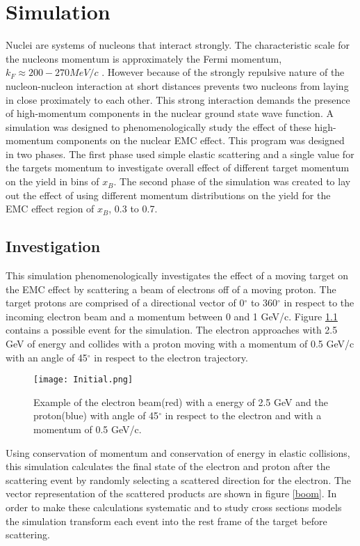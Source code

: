 
\chapter{Simulation}Nuclei are systems of nucleons that interact strongly. The characteristic scale for the nucleons momentum is approximately the Fermi momentum, $k_F \approx 200-270 MeV/c$ \cite{gomez}. However because of the strongly repulsive nature of the nucleon-nucleon interaction at short distances prevents two nucleons from laying in close proximately to each other. This strong interaction demands the presence of high-momentum components in the nuclear ground state wave function. A simulation was designed to phenomenologically study the effect of these high-momentum components on the nuclear EMC effect. This program was designed in two phases. The first phase used simple elastic scattering and a single value for the targets momentum to investigate overall effect of different target momentum on the yield in bins of $x_B$. The second phase of the simulation was created to lay out the effect of using different momentum distributions on the yield for the EMC effect region of $x_B$, 0.3 to 0.7.
\section{Investigation} This simulation phenomenologically investigates the effect of a moving target on the EMC effect by scattering a beam of electrons off of a moving proton. The target protons are comprised of a directional vector of 0$^\circ$ to 360$^\circ$ in respect to the incoming electron beam and a momentum between 0 and 1 GeV/c. Figure \ref{example} contains a possible event for the simulation. The electron approaches with 2.5 GeV of energy and collides with a proton moving with a momentum of 0.5 GeV/c with an angle of 45$^\circ$ in respect to the electron trajectory. 
\begin{figure}[h]
\centering
\caption{Example of the electron beam(red) with a energy of 2.5 GeV and the proton(blue) with angle of 45$^\circ$ in respect to the electron and with a momentum of 0.5 GeV/c.}
\texttt{[image: Initial.png]}
\label{example}
\end{figure}

Using conservation of momentum and conservation of energy in elastic collisions, this simulation calculates the final state of the electron and proton after the scattering event by randomly selecting a scattered direction for the electron. The vector representation of the scattered products are shown in figure \ref{boom}. In order to make these calculations systematic and to study cross sections models the simulation transform each event into the rest frame of the target before scattering. 

